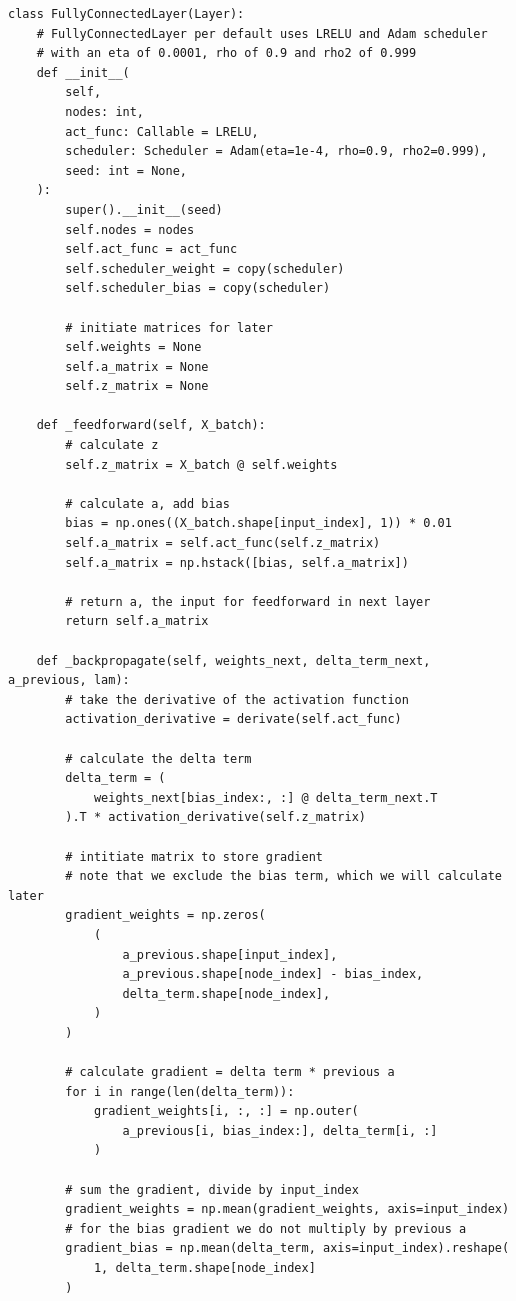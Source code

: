 \documentclass[%
oneside,                 %
final,                   %
10pt]{article}
\begin{document}
\begin{verbatim}
class FullyConnectedLayer(Layer):
    # FullyConnectedLayer per default uses LRELU and Adam scheduler
    # with an eta of 0.0001, rho of 0.9 and rho2 of 0.999
    def __init__(
        self,
        nodes: int,
        act_func: Callable = LRELU,
        scheduler: Scheduler = Adam(eta=1e-4, rho=0.9, rho2=0.999),
        seed: int = None,
    ):
        super().__init__(seed)
        self.nodes = nodes
        self.act_func = act_func
        self.scheduler_weight = copy(scheduler)
        self.scheduler_bias = copy(scheduler)

        # initiate matrices for later
        self.weights = None
        self.a_matrix = None
        self.z_matrix = None

    def _feedforward(self, X_batch):
        # calculate z
        self.z_matrix = X_batch @ self.weights

        # calculate a, add bias
        bias = np.ones((X_batch.shape[input_index], 1)) * 0.01
        self.a_matrix = self.act_func(self.z_matrix)
        self.a_matrix = np.hstack([bias, self.a_matrix])

        # return a, the input for feedforward in next layer
        return self.a_matrix

    def _backpropagate(self, weights_next, delta_term_next, a_previous, lam):
        # take the derivative of the activation function
        activation_derivative = derivate(self.act_func)

        # calculate the delta term
        delta_term = (
            weights_next[bias_index:, :] @ delta_term_next.T
        ).T * activation_derivative(self.z_matrix)

        # intitiate matrix to store gradient
        # note that we exclude the bias term, which we will calculate later
        gradient_weights = np.zeros(
            (
                a_previous.shape[input_index],
                a_previous.shape[node_index] - bias_index,
                delta_term.shape[node_index],
            )
        )

        # calculate gradient = delta term * previous a
        for i in range(len(delta_term)):
            gradient_weights[i, :, :] = np.outer(
                a_previous[i, bias_index:], delta_term[i, :]
            )

        # sum the gradient, divide by input_index
        gradient_weights = np.mean(gradient_weights, axis=input_index)
        # for the bias gradient we do not multiply by previous a
        gradient_bias = np.mean(delta_term, axis=input_index).reshape(
            1, delta_term.shape[node_index]
        )


\end{verbatim}
\end{document}
